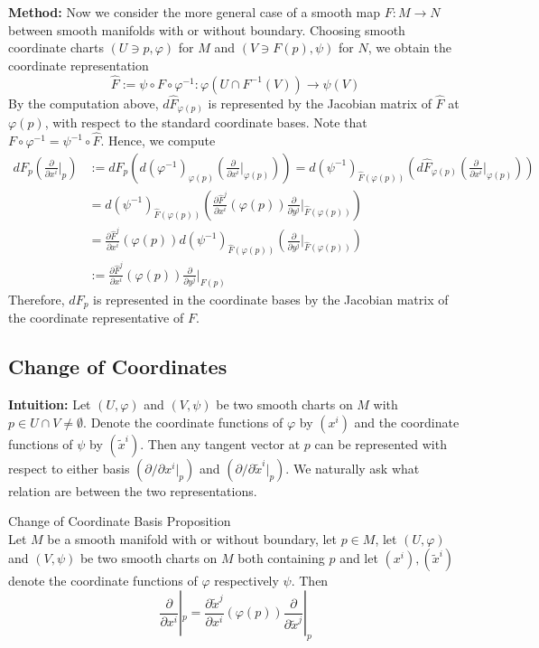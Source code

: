 \noindent\textbf{Method:} Now we consider the more general case of a smooth map $F:M\to N$ between smooth manifolds with or without boundary. Choosing smooth coordinate charts $(U\ni p,\varphi)$ for $M$ and $(V\ni F(p), \psi)$ for $N$, we obtain the coordinate representation
\[
\widehat{F} := \psi \circ F\circ \varphi^{-1} :\varphi(U\cap F^{-1} (V)) \to \psi(V)
\]
By the computation above, $d\widehat{F}_{\varphi(p)}$ is represented by the Jacobian matrix of $\widehat{F}$ at $\varphi(p)$, with respect to the standard coordinate bases. Note that $F \circ \varphi^{-1}= \psi^{-1} \circ \widehat{F}$. Hence, we compute
\begin{align*}
    dF_p(\frac{\partial}{\partial x^i}|_p) &:= dF_p (d(\varphi^{-1})_{\varphi(p)} (\frac{\partial}{\partial x^i}|_{\varphi(p)})) =d(\psi^{-1})_{\widehat{F} (\varphi(p))} (d\widehat{F} _{\varphi(p)} (\frac{\partial}{\partial x^i}|_{\varphi(p)}))\\
    &=d(\psi^{-1})_{\widehat{F} (\varphi(p))} (\frac{\partial \widehat{F}^j}{\partial x^i} (\varphi(p)) \frac{\partial}{\partial y^j}|_{\widehat{F} (\varphi(p))})\\
    &= \frac{\partial \widehat{F}^j}{\partial x^i} (\varphi(p)) d(\psi^{-1})_{\widehat{F} (\varphi(p))} (\frac{\partial}{\partial y^j}|_{\widehat{F} (\varphi(p))})\\
    &:= \frac{\partial \widehat{F}^j}{\partial x^i} (\varphi(p)) \frac{\partial}{\partial y^j}|_{{F} (p)}
\end{align*}
Therefore, $dF_p$ is represented in the coordinate bases by the Jacobian matrix of the coordinate representative of $F$.

\subsection{Change of Coordinates}

\noindent\textbf{Intuition:} Let $(U,\varphi)$ and $(V,\psi)$ be two smooth charts on $M$ with $p\in U\cap V\neq \emptyset$. Denote the coordinate functions of $\varphi$ by $(x^i)$ and the coordinate functions of $\psi$ by $(\widetilde{x}^i)$. Then any tangent vector at $p$ can be represented with respect to either basis $(\partial/ \partial x^i|_p)$ and $(\partial/ \partial \widetilde{x}^i|_p)$. We naturally ask what relation are between the two representations.

\begin{proposition}{Change of Coordinate Basis Proposition}\\
Let $M$ be a smooth manifold with or without boundary, let $p\in M$, let $(U,\varphi)$ and $(V,\psi)$ be two smooth charts on $M$ both containing $p$ and let $(x^i), (\widetilde{x}^i)$ denote the coordinate functions of $\varphi$ respectively $\psi$. Then
\[
\frac{\partial}{\partial x^i}|_p= \frac{\partial \widetilde{x}^j}{\partial x^i} (\varphi(p)) \frac{\partial}{\partial \widetilde{x}^j}|_p
\]
\end{proposition}

